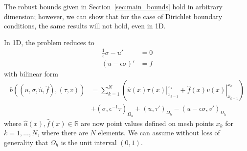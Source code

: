 \documentclass[11pt,onecolumn]{scrartcl}
\begin{document}
The robust bounds given in Section~\ref{sec:main_bounds} hold in arbitrary dimension; however, we can show that for the case of Dirichlet boundary conditions, the same results will not hold, even in 1D.  

In 1D, the problem reduces to 
\begin{align*}
\frac{1}{\epsilon}\sigma - u' &= 0\\
\left(u - \epsilon \sigma \right)' &=f
\end{align*}
with bilinear form
\begin{align*}
b\left(\left(u,\sigma,\widehat{u},\widehat{f}\right),\left(\tau,v\right)\right) &= \sum_{k=1}^N \left(\left.\widehat{u}(x) \tau(x)\right |^{x_k}_{x_{k-1}} + \left.\widehat{f}(x) v(x)\right |^{x_k}_{x_{k-1}}\right) \\
&+ \left(\sigma,\epsilon^{-1}\tau\right)_{\Omega_h} + (u,\tau')_{\Omega_h}- \left(u - \epsilon \sigma,v'\right)_{\Omega_h}
\end{align*}
where $\widehat{u}(x), \widehat{f}(x) \in \mathbb{R}$ are now point values defined on mesh points $x_k$ for $k=1,\ldots,N$, where there are $N$ elements.  We can assume without loss of generality that $\Omega_h$ is the unit interval $(0,1)$.  

\end{document}
